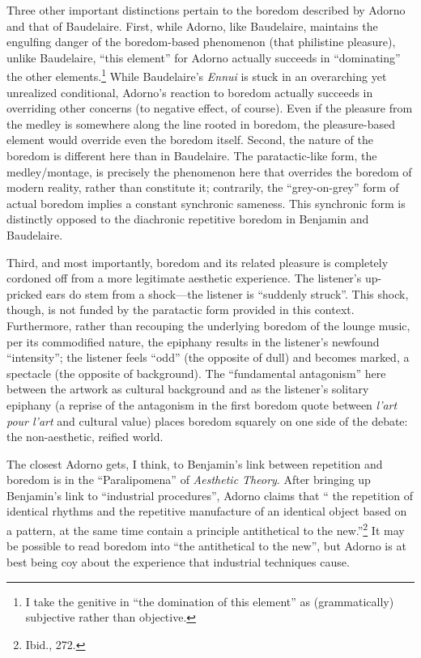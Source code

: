 \documentclass[12pt]{article}
\begin{document}
Three other important distinctions pertain to the boredom described by Adorno and that of Baudelaire. First, while Adorno, like Baudelaire, maintains the engulfing danger of the boredom-based phenomenon (that philistine pleasure), unlike Baudelaire, ``this element'' for Adorno actually succeeds in ``dominating'' the other elements.\footnote{I take the genitive in ``the domination of this element'' as (grammatically) subjective rather than objective.} While Baudelaire's \textit{Ennui} is stuck in an overarching yet unrealized conditional, Adorno's reaction to boredom actually succeeds in overriding other concerns (to negative effect, of course). Even if the pleasure from the medley is somewhere along the line rooted in boredom, the pleasure-based element would override even the boredom itself. Second, the nature of the boredom is different here than in Baudelaire. The paratactic-like form, the medley/montage, is precisely the phenomenon here that overrides the boredom of modern reality, rather than constitute it; contrarily, the ``grey-on-grey'' form of actual boredom implies a constant synchronic sameness. This synchronic form is distinctly opposed to the diachronic repetitive boredom in Benjamin and Baudelaire.  

Third, and most importantly, boredom and its related pleasure is completely cordoned off from a more legitimate aesthetic experience. The listener's up-pricked ears do stem from a shock---the listener is ``suddenly struck''. This shock, though, is not funded by the paratactic form provided in this context. Furthermore, rather than recouping the underlying boredom of the lounge music, per its commodified nature, the epiphany results in the listener's newfound ``intensity''; the listener feels ``odd'' (the opposite of dull) and becomes marked, a spectacle (the opposite of background). The ``fundamental antagonism'' here between the artwork as cultural background and as the listener's solitary epiphany (a reprise of the antagonism in the first boredom quote between \textit{l'art pour l'art} and cultural value) places boredom squarely on one side of the debate: the non-aesthetic, reified world.  

The closest Adorno gets, I think, to Benjamin's link between repetition and boredom is in the ``Paralipomena'' of \textit{Aesthetic Theory}. After bringing up Benjamin's link to ``industrial procedures'', Adorno claims that `` the repetition of identical rhythms and the repetitive manufacture of an identical object based on a pattern, at the same time contain a principle antithetical to the new.''\footnote{Ibid., 272.} It may be possible to read boredom into ``the antithetical to the new'', but Adorno is at best being coy about the experience that industrial techniques cause.
\end{document}
